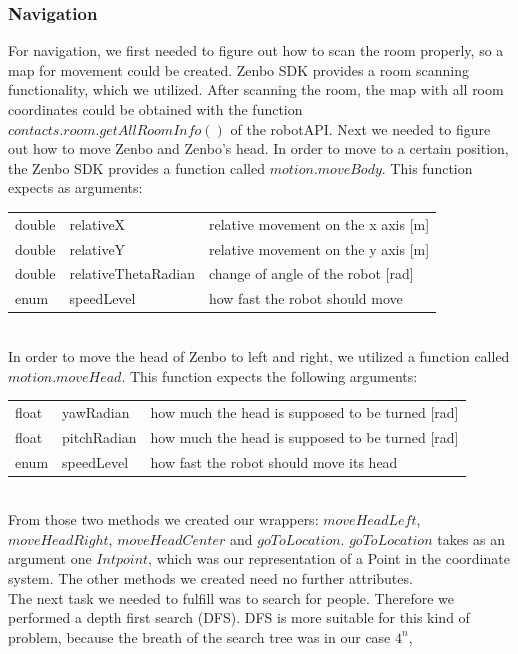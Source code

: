 \documentclass[conference]{IEEEtran}
\begin{document}
\subsubsection{Navigation}
For navigation, we first needed to figure out how to scan the room properly, so 
a map for movement could be created. Zenbo SDK provides a room scanning functionality, which we utilized.
After scanning the room, the map with all room coordinates could be obtained with the 
function $contacts.room.getAllRoomInfo()$ of the robotAPI.
Next we needed to figure out how to move Zenbo and Zenbo's head. In order to move to a certain position, the Zenbo SDK provides a function called $motion.moveBody$.
This function expects as arguments:
\begin{table}[h]
	\begin{tabular}{lll}
		double & relativeX           & relative movement on the x axis [m] \\
		double & relativeY           & relative movement on the y axis [m] \\
		double & relativeThetaRadian & change of angle of the robot [rad]  \\
		enum   & speedLevel          & how fast the robot should move      
	\end{tabular}
\end{table}\\
In order to move the head of Zenbo to left and right, we utilized a function called $motion.moveHead$.
This function expects the following arguments: 
\begin{table}[h]
	\begin{tabular}{lll}
		float & yawRadian   & how much the head is supposed to be turned [rad] \\
		float & pitchRadian & how much the head is supposed to be turned [rad] \\
		enum  & speedLevel  & how fast the robot should move  its head         
	\end{tabular}
\end{table}\\
From those two methods we created our wrappers: $moveHeadLeft$, $moveHeadRight$, $moveHeadCenter$ 
and $goToLocation$.
$goToLocation$ takes as an argument one $Intpoint$, which was our representation of a Point in the coordinate system.
The other methods we created need no further attributes.\\
The next task we needed to fulfill was to search for people. Therefore we performed a depth first search (DFS).
DFS is more suitable for this kind of problem, because the breath of the search tree was in our case $4^n$, 
\end{document}
